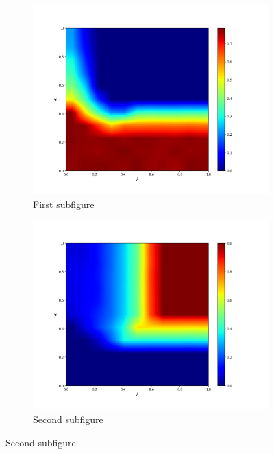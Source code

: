 \documentclass{article}
\begin{document}
\begin{figure}[t!] %
\begin{subfigure}{0.48\textwidth}
\includegraphics[width=\linewidth]{b013_1.png}
\caption{First subfigure} \label{fig:a}
\end{subfigure}\hspace*{\fill}
\begin{subfigure}{0.48\textwidth}
\includegraphics[width=\linewidth]{b013_2.png}
\caption{Second subfigure} \label{fig:b}
\end{subfigure}\hspace*{\fill}

\end{figure}
\end{document}
